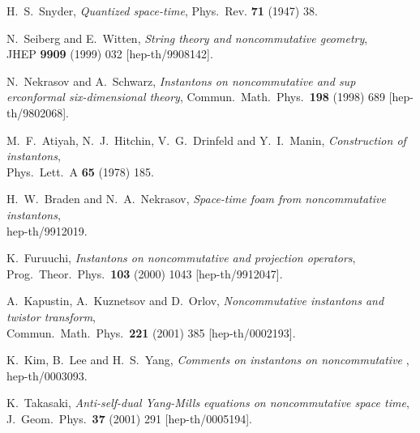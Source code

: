 \documentclass[a4paper,11pt,english]{article}
\numberwithin{equation}{section}
\renewcommand{\=}{\ =\ }
\begin{document}
\begin{thebibliography}{99}

         H.~S.~Snyder,
         {\em Quantized space-time}, %
         Phys.\ Rev. {\bf 71} (1947) 38.

         N.~Seiberg and E.~Witten,
         {\em String theory and noncommutative geometry},\\
         JHEP {\bf 9909} (1999) 032
         [hep-th/9908142].

         N.~Nekrasov and A.~Schwarz,
         {\em Instantons on noncommutative \coordHE{} and \coordHE{} sup%
erconformal six-dimensional theory},
         Commun.\ Math.\ Phys.\  {\bf 198} (1998) 689
         [hep-th/9802068].

         M.~F.~Atiyah, N.~J.~Hitchin, V.~G.~Drinfeld and Y.~I.~Manin,
         {\em Construction of instantons},\\
         Phys.\ Lett.\ A {\bf 65} (1978) 185.

         H.~W.~Braden and N.~A.~Nekrasov,
         {\em Space-time foam from noncommutative instantons},\\
         hep-th/9912019.

         K.~Furuuchi,
         {\em Instantons on noncommutative \coordHE{} and projection %
operators},\\
         Prog.\ Theor.\ Phys.\  {\bf 103} (2000) 1043
         [hep-th/9912047].

       A.~Kapustin, A.~Kuznetsov and D.~Orlov,
       {\em Noncommutative instantons and twistor transform},\\
       Commun.\ Math.\ Phys.\  {\bf 221} (2001) 385
       [hep-th/0002193].

         K.~Kim, B.~Lee and H.~S.~Yang,
         {\em Comments on instantons on noncommutative \coordHE{}},\\
         hep-th/0003093.

         K.~Takasaki,
         {\em Anti-self-dual Yang-Mills equations on noncommutative space%
time},\\
         J.\ Geom.\ Phys.\  {\bf 37} (2001) 291
         [hep-th/0005194].


\end{thebibliography}
\end{document}
